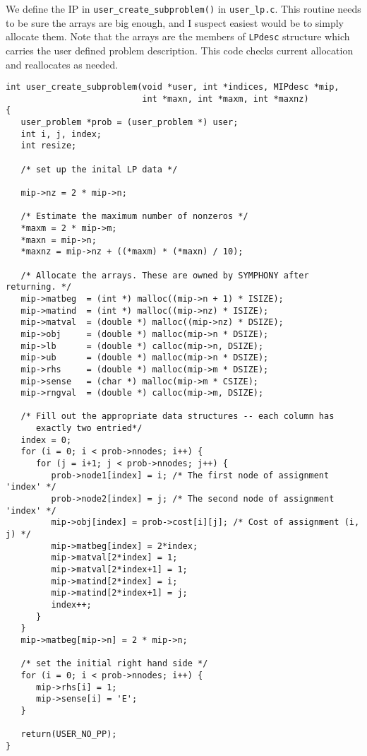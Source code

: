 \documentclass[11pt]{article}
\begin{document}
We define the IP in \texttt{user\_create\_subproblem()} in
\texttt{user\_lp.c}. This routine needs to be sure the arrays are big enough,
and I suspect easiest would be to simply allocate them. Note that the arrays
are the members of \texttt{LPdesc} structure which carries the user defined
problem description. This code checks current allocation and reallocates as
needed.
\newpage
\begin{verbatim}
int user_create_subproblem(void *user, int *indices, MIPdesc *mip, 
                           int *maxn, int *maxm, int *maxnz)
{
   user_problem *prob = (user_problem *) user;
   int i, j, index;
   int resize;

   /* set up the inital LP data */

   mip->nz = 2 * mip->n;

   /* Estimate the maximum number of nonzeros */
   *maxm = 2 * mip->m;
   *maxn = mip->n;
   *maxnz = mip->nz + ((*maxm) * (*maxn) / 10);
   
   /* Allocate the arrays. These are owned by SYMPHONY after returning. */
   mip->matbeg  = (int *) malloc((mip->n + 1) * ISIZE);
   mip->matind  = (int *) malloc((mip->nz) * ISIZE);
   mip->matval  = (double *) malloc((mip->nz) * DSIZE);
   mip->obj     = (double *) malloc(mip->n * DSIZE);
   mip->lb      = (double *) calloc(mip->n, DSIZE);
   mip->ub      = (double *) malloc(mip->n * DSIZE);
   mip->rhs     = (double *) malloc(mip->m * DSIZE);
   mip->sense   = (char *) malloc(mip->m * CSIZE);
   mip->rngval  = (double *) calloc(mip->m, DSIZE);
   
   /* Fill out the appropriate data structures -- each column has
      exactly two entried*/
   index = 0;
   for (i = 0; i < prob->nnodes; i++) {
      for (j = i+1; j < prob->nnodes; j++) {
         prob->node1[index] = i; /* The first node of assignment 'index' */
         prob->node2[index] = j; /* The second node of assignment 'index' */
         mip->obj[index] = prob->cost[i][j]; /* Cost of assignment (i, j) */
         mip->matbeg[index] = 2*index;
         mip->matval[2*index] = 1;
         mip->matval[2*index+1] = 1;
         mip->matind[2*index] = i;
         mip->matind[2*index+1] = j;
         index++;
      }
   }
   mip->matbeg[mip->n] = 2 * mip->n;
   
   /* set the initial right hand side */
   for (i = 0; i < prob->nnodes; i++) {
      mip->rhs[i] = 1;
      mip->sense[i] = 'E';
   }

   return(USER_NO_PP);
}      
\end{verbatim}
\end{document}
